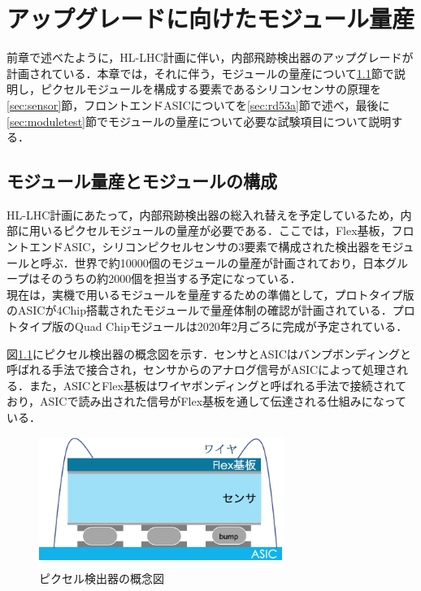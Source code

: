 \chapter{アップグレードに向けたモジュール量産}
前章で述べたように，HL-LHC計画に伴い，内部飛跡検出器のアップグレードが計画されている．本章では，それに伴う，モジュールの量産について\ref{sec:masspro}節で説明し，ピクセルモジュールを構成する要素であるシリコンセンサの原理を\ref{sec:sensor}節，フロントエンドASICについてを\ref{sec:rd53a}節で述べ，最後に\ref{sec:moduletest}節でモジュールの量産について必要な試験項目について説明する．\\

\section{モジュール量産とモジュールの構成}
\label{sec:masspro}
HL-LHC計画にあたって，内部飛跡検出器の総入れ替えを予定しているため，内部に用いるピクセルモジュールの量産が必要である．ここでは，Flex基板，フロントエンドASIC，シリコンピクセルセンサの3要素で構成された検出器をモジュールと呼ぶ．世界で約10000個のモジュールの量産が計画されており，日本グループはそのうちの約2000個を担当する予定になっている．\\
現在は，実機で用いるモジュールを量産するための準備として，プロトタイプ版のASICが4$\mathrm{Chip}$搭載されたモジュールで量産体制の確認が計画されている．プロトタイプ版のQuad Chipモジュールは2020年2月ごろに完成が予定されている．\par
図\ref{fig:module}にピクセル検出器の概念図を示す．センサとASICはバンプボンディングと呼ばれる手法で接合され，センサからのアナログ信号がASICによって処理される．また，ASICとFlex基板はワイヤボンディングと呼ばれる手法で接続されており，ASICで読み出された信号がFlex基板を通して伝達される仕組みになっている．\par

\begin{figure}[h]
  \centering
  \includegraphics[width=8cm]{./figure/module.png}
  \caption{ピクセル検出器の概念図}
  \label{fig:module}
\end{figure}

